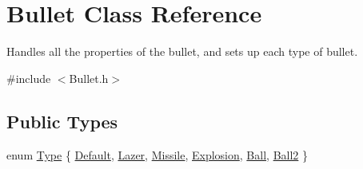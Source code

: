 \hypertarget{class_bullet}{}\section{Bullet Class Reference}
\label{class_bullet}


Handles all the properties of the bullet, and sets up each type of bullet.  




{\ttfamily \#include $<$Bullet.\+h$>$}

\subsection*{Public Types}
\begin{DoxyCompactItemize}
\item 
enum \hyperlink{class_bullet_adec43a70f99a7264217f71d4299796c3}{Type} \{ \newline
\hyperlink{class_bullet_adec43a70f99a7264217f71d4299796c3a4b20d6d9b77e501c9a41cef53b3f99b9}{Default}, 
\hyperlink{class_bullet_adec43a70f99a7264217f71d4299796c3aba34aa5cf5a49291cee710ffa9774f55}{Lazer}, 
\hyperlink{class_bullet_adec43a70f99a7264217f71d4299796c3a879dee304f28c3bc708ead5da2ee84e6}{Missile}, 
\hyperlink{class_bullet_adec43a70f99a7264217f71d4299796c3a28fbf11ec068c08b1eec3f886d0be8b5}{Explosion}, 
\newline
\hyperlink{class_bullet_adec43a70f99a7264217f71d4299796c3a30345037f1b00902f2667bb0a2638183}{Ball}, 
\hyperlink{class_bullet_adec43a70f99a7264217f71d4299796c3a4404b4dbb15a2d4584ccbe3495266060}{Ball2}
 \}
\end{DoxyCompactItemize}
